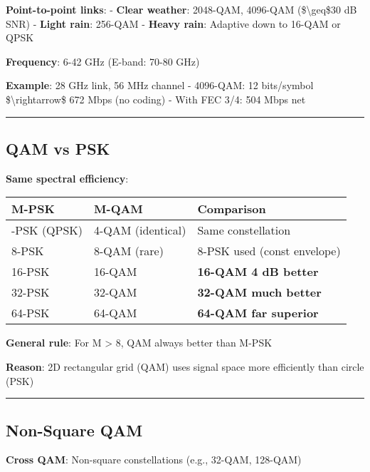 \textbf{Point-to-point links}: - \textbf{Clear weather}: 2048-QAM,
4096-QAM (\$\textbackslash geq\$30 dB SNR) - \textbf{Light rain}:
256-QAM - \textbf{Heavy rain}: Adaptive down to 16-QAM or QPSK

\textbf{Frequency}: 6-42 GHz (E-band: 70-80 GHz)

\textbf{Example}: 28 GHz link, 56 MHz channel - 4096-QAM: 12 bits/symbol
\$\textbackslash rightarrow\$ 672 Mbps (no coding) - With FEC 3/4: 504
Mbps net

\begin{center}\rule{0.5\linewidth}{0.5pt}\end{center}

\subsection{QAM vs PSK}\label{qam-vs-psk}

\textbf{Same spectral efficiency}:

{\def\LTcaptype{} %
\begin{longtable}[]{@{}lll@{}}
\toprule\noalign{}
M-PSK & M-QAM & Comparison \\
\midrule\noalign{}
\endhead
\bottomrule\noalign{}
\endlastfoot
4-PSK (QPSK) & 4-QAM (identical) & Same constellation \\
8-PSK & 8-QAM (rare) & 8-PSK used (const envelope) \\
16-PSK & 16-QAM & \textbf{16-QAM 4 dB better} \\
32-PSK & 32-QAM & \textbf{32-QAM much better} \\
64-PSK & 64-QAM & \textbf{64-QAM far superior} \\
\end{longtable}
}

\textbf{General rule}: For M \textgreater{} 8, QAM always better than
M-PSK

\textbf{Reason}: 2D rectangular grid (QAM) uses signal space more
efficiently than circle (PSK)

\begin{center}\rule{0.5\linewidth}{0.5pt}\end{center}

\subsection{Non-Square QAM}\label{non-square-qam}

\textbf{Cross QAM}: Non-square constellations (e.g., 32-QAM, 128-QAM)

